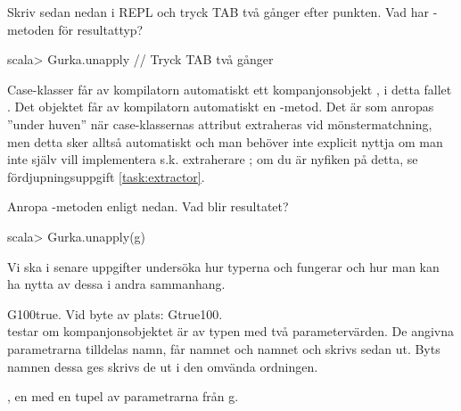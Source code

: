 \Subtask Skriv sedan nedan i REPL och tryck TAB två gånger efter punkten. Vad har -metoden för resultattyp?
\begin{REPL}
scala> Gurka.unapply   // Tryck TAB två gånger
\end{REPL}
\begin{Background}
Case-klasser får av kompilatorn automatiskt ett kompanjonsobjekt , i detta fallet . Det objektet får av kompilatorn automatiskt en -metod. Det är  som anropas ''under huven'' när case-klassernas attribut extraheras vid mönstermatchning, men detta sker alltså automatiskt och man behöver inte explicit nyttja  om man inte själv vill implementera s.k. extraherare ; om du är nyfiken på detta, se fördjupningsuppgift \ref{task:extractor}.
\end{Background}

\Subtask Anropa -metoden enligt nedan. Vad blir resultatet?
\begin{REPL}
scala> Gurka.unapply(g)
\end{REPL}
Vi ska i senare uppgifter undersöka hur typerna  och  fungerar och hur man kan ha nytta av dessa i andra sammanhang.

%

\SOLUTION


\TaskSolved \what


\SubtaskSolved  G100true. Vid byte av plats: Gtrue100.\\
 testar om kompanjonsobjektet  är av typen  med två parametervärden. De angivna parametrarna tilldelas namn,  får namnet  och  namnet  och skrivs sedan ut. Byts namnen dessa ges skrivs de ut i den omvända ordningen.

\SubtaskSolved  {}

\SubtaskSolved  {}, en  med en tupel av parametrarna från g.




